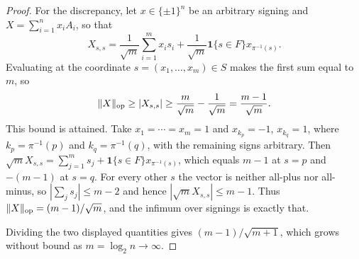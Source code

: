 \begin{cxrefutation}
\begin{proof}
For the discrepancy, let $x\in\{\pm1\}^n$ be an arbitrary signing and $X=\sum_{i=1}^nx_iA_i$, so that
\[
X_{s,s}=\frac1{\sqrt m}\sum_{i=1}^mx_is_i+\frac1{\sqrt m}\mathbf 1\{s\in F\}x_{\pi^{-1}(s)}.
\]
Evaluating at the coordinate $s=(x_1,\ldots,x_m)\in S$ makes the first sum equal to $m$, so
\[
\|X\|_{\rm op}\ge|X_{s,s}|\ge\frac{m}{\sqrt m}-\frac1{\sqrt m}=\frac{m-1}{\sqrt m}.
\]
This bound is attained.  Take $x_1=\cdots=x_m=1$ and $x_{k_p}=-1$, $x_{k_q}=1$, where $k_p=\pi^{-1}(p)$ and $k_q=\pi^{-1}(q)$, with the remaining signs arbitrary.  Then $\sqrt mX_{s,s}=\sum_{j=1}^ms_j+\mathbf 1\{s\in F\}x_{\pi^{-1}(s)}$, which equals $m-1$ at $s=p$ and $-(m-1)$ at $s=q$.  For every other $s$ the vector is neither all-plus nor all-minus, so $|\sum_js_j|\le m-2$ and hence $|\sqrt mX_{s,s}|\le m-1$.  Thus $\|X\|_{\rm op}=(m-1)/\sqrt m$, and the infimum over signings is exactly that.

Dividing the two displayed quantities gives $(m-1)/\sqrt{m+1}$, which grows without bound as $m=\log_2n\to\infty$.
\end{proof}


\end{cxrefutation}


